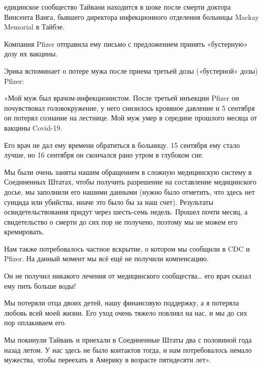 едицинское сообщество Тайвани находится в шоке после смерти доктора Винсента
Ванга, бывшего директора инфекционного отделения больницы Mackay Memorial в
Тайбэе.

Компания Pfizer отправила ему письмо с предложением принять «бустерную» дозу их
вакцины.

Эрика вспоминает о потере мужа после приема третьей дозы («бустерной» дозы)
Pfizer:

«Мой муж был врачом-инфекционистом. После третьей инъекции Pfizer он
почувствовал головокружение, у него снизилось кровяное давление и 5 сентября он
потерял сознание на лестнице. Мой муж умер в середине прошлого месяца от вакцины
Covid-19.

Его врач не дал ему времени обратиться в больницу. 15 сентября ему стало лучше,
но 16 сентября он скончался рано утром в глубоком сне.

Мы были очень заняты нашим обращением в сложную медицинскую систему в
Соединенных Штатах, чтобы получить разрешение на составление медицинского досье,
мы заполнили его нашими данными (нужно было отметить, что здесь нет суицида или
убийства, иначе это было бы за наш счет). Результаты освидетельствования придут
через шесть-семь недель. Прошел почти месяц, а свидетельство о смерти до сих пор
не получено, поэтому мы не можем его кремировать.

Нам также потребовалось частное вскрытие, о котором мы сообщили в CDC и
Pfizer. На данный момент мы всё ещё не получили компенсацию.

Он не получил никакого лечения от медицинского сообщества… его врач сказал ему
пить больше воды!

Мы потеряли отца двоих детей, нашу финансовую поддержку, а я потеряла любовь
всей моей жизни. Его уход очень тяжело повлиял на нас, и мы до сих пор
оплакиваем его.

Мы покинули Тайвань и приехали в Соединенные Штаты два с половиной года назад
летом. У нас здесь не было контактов тогда, и нам потребовалось немало мужества,
чтобы переехать в Америку в возрасте пятидесяти лет».
